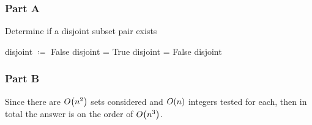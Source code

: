 \documentclass[12pt,titlepage]{extarticle}
\begin{document}
\subsubsection*{Part A}
\begin{algorithm}[H]
    \caption{Determine if a disjoint subset pair exists}
    \begin{algorithmic}[1]
        \State disjoint $\coloneq$ False
                \State disjoint = True 
                    \State disjoint = False
                \EndIf
                \EndFor
            \EndFor
        \EndFor
        \State \Return disjoint
        \EndFunction
    \end{algorithmic}
\end{algorithm}

\subsubsection*{Part B}
Since there are $O\qty(n^2)$ sets considered and $O\qty(n)$ integers tested for each, then in total the answer is on the order of $O\qty(n^3)$.
\end{document}
